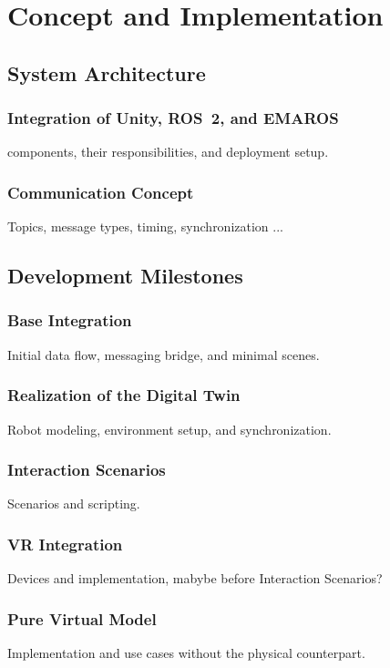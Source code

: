 \chapter{Concept and Implementation} \label{chap:concept}



\section{System Architecture}
\subsection{Integration of Unity, ROS~2, and EMAROS}
components, their responsibilities, and deployment setup.

\subsection{Communication Concept}
Topics, message types, timing, synchronization ...

\section{Development Milestones}
\subsection{Base Integration}
Initial data flow, messaging bridge, and minimal scenes.

\subsection{Realization of the Digital Twin}
Robot modeling, environment setup, and synchronization.

\subsection{Interaction Scenarios}
Scenarios and scripting. 

\subsection{VR Integration}
Devices and implementation, mabybe before Interaction Scenarios?

\subsection{Pure Virtual Model}
Implementation and use cases without the physical counterpart.

